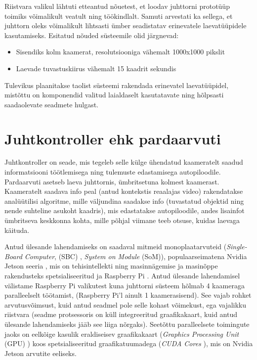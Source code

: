 
Riistvara valikul lähtuti etteantud nõuetest, et loodav juhttorni prototüüp toimiks võimalikult veatult ning töökindlalt. Samuti arvestati ka sellega, et juhttorn oleks võimalikult lihtsasti ümber seadistatav erinevatele laevatüüpidele kasutamiseks. Esitatud nõuded süsteemile olid järgnevad:

\begin{itemize}
\item
  Sisendiks kolm kaamerat, resolutsiooniga vähemalt 1000x1000 pikslit
\item
  Laevade tuvastuskiirus vähemalt 15 kaadrit sekundis
\end{itemize}

Tulevikus plaanitakse taolist süsteemi rakendada erinevatel laevatüüpidel, mistõttu on komponendid valitud laialdaselt kasutatavate ning hõlpsasti saadaolevate seadmete hulgast.

\section{Juhtkontroller ehk pardaarvuti}\label{juhtkontroller-ehk-pardaarvuti}

Juhtkontroller on seade, mis tegeleb selle külge ühendatud kaameratelt saadud informatsiooni töötlemisega ning tulemuste edastamisega autopiloodile. Pardaarvuti asetseb laeva juhttornis, ümbritsetuna kolmest kaamerast. Kaameratelt saadava info peal (antud kontekstis reaalajas video) rakendatakse analüütilisi algoritme, mille väljundina saadakse info (tuvastatud objektid ning nende suhteline asukoht kaadris), mis edastatakse autopiloodile, andes lisainfot ümbritseva keskkonna kohta, mille põhjal viimane teeb otsuse, kuidas laevaga käituda.

Antud ülesande lahendamiseks on saadaval mitmeid monoplaatarvuteid (\emph{Single-Board Computer}, (SBC) \cite{ref19}, \emph{System on Module} (SoM)), populaarseimatena Nvidia Jetson seeria \cite{ref20}, mis on tehisintellekti ning masinnägemise ja masinõppe rakendusteks spetsialiseeritud ja Raspberry Pi \cite{ref21}. Antud ülesande lahendamisel välistame Raspberry Pi valikutest kuna juhttorni süsteem hõlmab 4 kaameraga paralleelselt töötamist, (Raspberry Pi'l ainult 1 kaamerasisend). See vajab rohket arvutusvõimsust, kuid antud seadmel pole selle kohast võimekust, ega vajalikku riistvara (seadme protsessoris on küll integreeritud graafikakaart, kuid antud ülesande lahendamiseks jääb see liiga nõrgaks). Seetõttu paralleelsete toimingute jaoks on eelkõige kasulik eraldiseisev graafikakaart (\emph{Graphics Processing Unit} (GPU) \cite{ref22}) koos spetsialiseeritud graafikatuumadega (\emph{CUDA Cores} \cite{ref23}), mis on Nvidia Jetson arvutite eeliseks.

